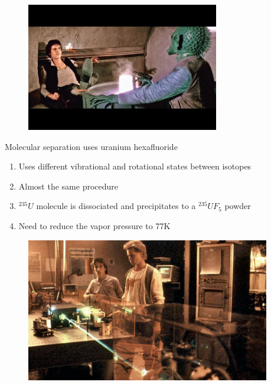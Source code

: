 \documentclass[aspectratio=1610,pdftex,dvipsnames,compress,xcolor={dvipsnames}]{beamer}
\begin{document}
\begin{frame}{}
    \begin{figure}
        \centering
        \includegraphics[width=0.75\textwidth]{han.solo.jpg}
    \end{figure}
\end{frame}


\begin{frame}{Molecular separation uses uranium hexafluoride}
    \begin{enumerate}[topsep=0pt,itemsep=21pt,leftmargin=*,label=(\arabic*)]
        \item[]Uses different vibrational and rotational states between isotopes
        \item[]Almost the same procedure
        \item[]$^{235}U$ molecule is dissociated and precipitates to a $^{235}UF_5$ powder
        \item[]Need to reduce the vapor pressure to 77K
    \end{enumerate}
\end{frame}


\begin{frame}{}
    \begin{figure}
        \centering
        \includegraphics[width=0.95\textwidth]{real.genius.jpg}
    \end{figure}
\end{frame}
\end{document}

